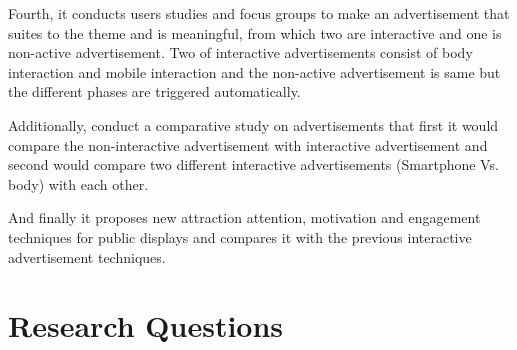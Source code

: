 Fourth, it conducts users studies and focus groups to make an advertisement that suites to the theme and is meaningful, from which two are interactive and one is non-active advertisement. Two of interactive advertisements consist of body interaction and mobile interaction and the non-active advertisement is same but the different phases are triggered automatically.

Additionally, conduct a comparative study on advertisements that first it would compare the non-interactive advertisement with interactive advertisement and second would compare two different interactive advertisements (Smartphone Vs. body) with each other.

And finally it proposes new attraction attention, motivation and engagement techniques for public displays and compares it with the previous interactive advertisement techniques.

\section{Research Questions}



\begin{table}[H]
\caption{Summary of Research Questions }
\label{tab:summaryofresearchquestions}
\end{table}



